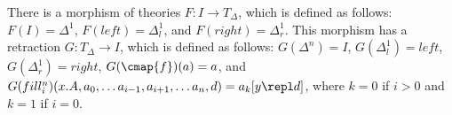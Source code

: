There is a morphism of theories $F : I \to T_\Delta$, which is defined as follows: $F(I) = \Delta^1$, $F(left) = \Delta^1_l$, and $F(right) = \Delta^1_r$.
This morphism has a retraction $G : T_\Delta \to I$, which is defined as follows: $G(\Delta^n) = I$, $G(\Delta^1_l) = left$, $G(\Delta^1_r) = right$, $G(\cmap{f})(a) = a$,
and $G(fill^n_i)(x.A, a_0, \ldots a_{i-1}, a_{i+1}, \ldots a_n, d) = a_k[y \repl d]$, where $k = 0$ if $i > 0$ and $k = 1$ if $i = 0$.
